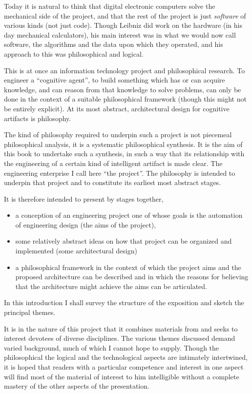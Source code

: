 Today it is natural to think that digital electronic computers solve the mechanical side
of the project, and that the rest of the project is just {\it software} of
various kinds (not just code).
Though Leibniz did work on the hardware (in his day mechanical
calculators), his main interest was in what we would now call software,
the algorithms and the data upon which they operated, and his approach
to this was philosophical and logical.
 
This is at once an information technology project and philosophical research.
To engineer a ``cognitive agent'', to build something which has or can
acquire knowledge, and can reason from that knowledge to solve
problems, can only be done in the context of a suitable philosophical
framework (though this might not be entirely explicit).
At its most abstract, architectural design for cognitive artifacts is
philosophy.

The kind of philosophy required to underpin such a project is not
piecemeal philosophical analysis, it is a systematic philosophical
synthesis.
It is the aim of this book to undertake such a synthesis, in such a
way that its relationship with the engineering of a certain kind of
intelligent artifact is made clear.
The engineering enterprise I call here ``the project''.
The philosophy is intended to underpin that project and to constitute
its earliest most abstract stages.

It is therefore intended to present by stages together,
\begin{itemize}
\item a conception of an engineering project one of whose goals is the
  automation of engineering design (the aims of the project),
\item some relatively abstract ideas on how that project can be
  organized and implemented (some architectural design)
\item a philosophical framework in the context of which the project
  aims and the proposed architecture can be described and in which the
  reasons for believing that the architecture might achieve the aims
  can be articulated.
\end{itemize}

In this introduction I shall survey the structure of the exposition
and sketch the principal themes.

It is in the nature of this project that it combines materials from
and seeks to interest devotees of diverse disciplines.
The various themes discussed demand varied background, much of which I
cannot hope to supply.
Though the philosophical the logical and the technological aspects are
intimately intertwined, it is hoped that readers with a particular
competence and interest in one aspect will find most of the material
of interest to him intelligible without a complete mastery of the
other aspects of the presentation.

